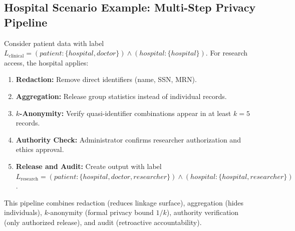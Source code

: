 \subsection{Hospital Scenario Example: Multi-Step Privacy Pipeline}

Consider patient data with label $L_{\text{clinical}} = (patient:\{hospital,doctor\}) \wedge (hospital:\{hospital\})$. For research access, the hospital applies:

\begin{enumerate}
  \item \textbf{Redaction:} Remove direct identifiers (name, SSN, MRN).
  \item \textbf{Aggregation:} Release group statistics instead of individual records.
  \item \textbf{$k$-Anonymity:} Verify quasi-identifier combinations appear in at least $k = 5$ records.
  \item \textbf{Authority Check:} Administrator confirms researcher authorization and ethics approval.
  \item \textbf{Release and Audit:} Create output with label $L_{\text{research}} = (patient:\{hospital,doctor,researcher\}) \wedge (hospital:\{hospital,researcher\})$.
\end{enumerate}

This pipeline combines redaction (reduces linkage surface), aggregation (hides individuals), $k$-anonymity (formal privacy bound $1/k$), authority verification (only authorized release), and audit (retroactive accountability).

